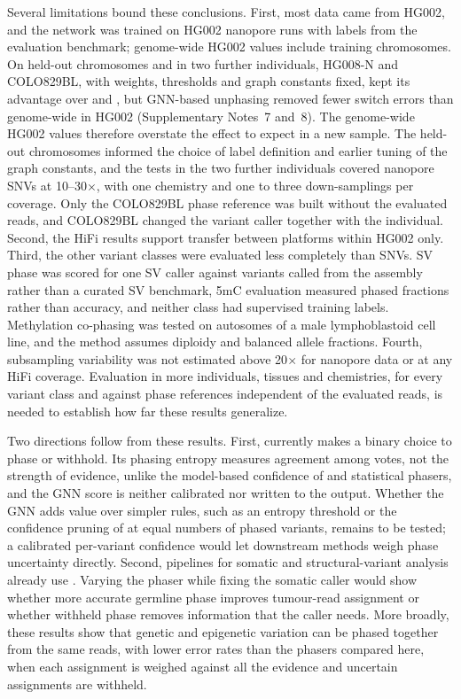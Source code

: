 Several limitations bound these conclusions. First, most data came from HG002, and the network was trained on HG002 nanopore runs with labels from the evaluation benchmark; genome-wide HG002 values include training chromosomes. On held-out chromosomes and in two further individuals, HG008-N and COLO829BL, with weights, thresholds and graph constants fixed, \toolname kept its advantage over \whatshap and \hapcut, but GNN-based unphasing removed fewer switch errors than genome-wide in HG002 (Supplementary Notes~7 and~8). The genome-wide HG002 values therefore overstate the effect to expect in a new sample. The held-out chromosomes informed the choice of label definition and earlier tuning of the graph constants, and the tests in the two further individuals covered nanopore SNVs at 10--30$\times$, with one chemistry and one to three down-samplings per coverage. Only the COLO829BL phase reference was built without the evaluated reads, and COLO829BL changed the variant caller together with the individual. Second, the HiFi results support transfer between platforms within HG002 only. Third, the other variant classes were evaluated less completely than SNVs. SV phase was scored for one SV caller against variants called from the assembly rather than a curated SV benchmark, 5mC evaluation measured phased fractions rather than accuracy, and neither class had supervised training labels. Methylation co-phasing was tested on autosomes of a male lymphoblastoid cell line\cite{fu2024methphaser}, and the method assumes diploidy and balanced allele fractions. Fourth, subsampling variability was not estimated above 20$\times$ for nanopore data or at any HiFi coverage. Evaluation in more individuals, tissues and chemistries, for every variant class and against phase references independent of the evaluated reads, is needed to establish how far these results generalize.

Two directions follow from these results. First, \toolname currently makes a binary choice to phase or withhold. Its phasing entropy measures agreement among votes, not the strength of evidence, unlike the model-based confidence of \hapcut\cite{edge2017hapcut2} and statistical phasers\cite{hofmeister2023shapeit5}, and the GNN score is neither calibrated nor written to the output. Whether the GNN adds value over simpler rules, such as an entropy threshold or the confidence pruning of \hapcut at equal numbers of phased variants, remains to be tested; a calibrated per-variant confidence would let downstream methods weigh phase uncertainty directly. Second, pipelines for somatic and structural-variant analysis already use \longphase\cite{zheng2022clair3,zheng2026clairs,keskus2025severus,ont2025wfhuman}. Varying the phaser while fixing the somatic caller would show whether more accurate germline phase improves tumour-read assignment or whether withheld phase removes information that the caller needs. More broadly, these results show that genetic and epigenetic variation can be phased together from the same reads, with lower error rates than the phasers compared here, when each assignment is weighed against all the evidence and uncertain assignments are withheld.

